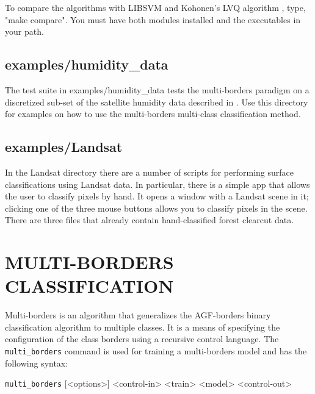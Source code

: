 \documentclass[12pt]{article}
\begin{document}
  To compare the algorithms with LIBSVM \citep{Lin_Lin2011} and Kohonen's LVQ algorithm \citep{Kohonen2000}, type, "make compare".  You must have both modules installed and the executables in your path.


\subsection{examples/humidity_data}

The test suite in examples/humidity_data tests the multi-borders paradigm on a discretized sub-set of the satellite humidity data described in \citet{Mills_2009}.  Use this directory for examples on how to use the multi-borders multi-class classification method.

\subsection{examples/Landsat}

In the Landsat directory there are a number of scripts for performing surface classifications using Landsat data.  In particular, there is a simple app that allows the user to classify pixels by hand.  It opens a window with a Landsat scene in it; clicking one of the three mouse buttons allows you to classify pixels in the scene.  There are three files that already contain hand-classified forest clearcut data.


\section{MULTI-BORDERS CLASSIFICATION}

\label{MULTI_BORDERS_CLASSIFICATION}

  Multi-borders is an algorithm that generalizes the AGF-borders binary classification algorithm to multiple classes.  It is a means of specifying the configuration of the class borders using a recursive control language.  The \verb/multi_borders/ command is used for training a multi-borders model and has the following syntax:

  \verb/multi_borders/ [<options>] <control-in> <train> <model> <control-out>
\end{document}
